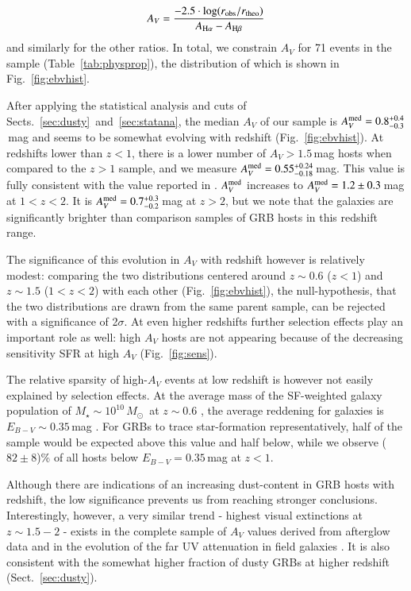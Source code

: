 \documentclass[traditabstract, longauth]{aa}
\newcommand{\Msun}{$M_\odot$}
\begin{document}
\begin{equation}
A_V = \frac{-2.5\cdot\log({r_{\rm{obs}}}/{r_{\rm{theo}}})} {A_{{\rm{H}\alpha}}-A_{{\rm{H}\beta}}}
\end{equation}
and similarly for the other ratios. In total, we constrain $A_V$ for 71 events in the sample (Table~\ref{tab:physprop}), the distribution of which is shown in Fig.~\ref{fig:ebvhist}. 

 {After applying the statistical analysis and cuts of Sects.~\ref{sec:dusty}~and~\ref{sec:statana}, the median $A_V$ of our sample is $A_V^{\rm med}=0.8^{+0.4}_{-0.3}$\,mag} and seems to be somewhat evolving with redshift (Fig.~\ref{fig:ebvhist}). At redshifts lower than $z<1$, there is a lower number of $A_V>1.5$\,mag hosts when compared to the $z>1$ sample, and we measure $A_V^{\rm{med}}=0.55_{-0.18}^{+0.24}$\,mag. This value is fully consistent with the value reported in \citet{2009ApJ...691..182S}. $A_V^{\rm{med}}$ increases to $A_V^{\rm{med}}=1.2\pm0.3$\,mag at $1<z<2$. It is $A_V^{\rm{med}}=0.7_{-0.2}^{+0.3}$\,mag at $z > 2$, but we note that the galaxies are significantly brighter than comparison samples of GRB hosts in this redshift range.

The significance of this evolution in $A_V$ with redshift however is relatively modest: comparing the two distributions centered around $z\sim0.6$ ($z<1$) and $z\sim1.5$ ($1<z<2$) with each other (Fig.~\ref{fig:ebvhist}), the null-hypothesis, that the two distributions are drawn from the same parent sample, can be rejected with a significance of 2$\sigma$. At even higher redshifts further selection effects play an important role as well: high $A_V$ hosts are not appearing because of the decreasing sensitivity SFR at high $A_V$ (Fig.~\ref{fig:sens}). 

{The relative sparsity of high-$A_V$ events at low redshift is however not easily explained by selection effects. At the average mass of the SF-weighted galaxy population of $M_{\star}\sim10^{10}$\,\Msun\, at $z\sim0.6$ \citep{2013ApJ...778..128P, 2014A&A...565A.112H}, the average reddening for galaxies is $E_{B-V}\sim0.35$\,{mag} \citep[][and references therein]{2014ApJ...792...75Z}. For GRBs to trace star-formation representatively, half of the sample would be expected above this value and half below, while we observe ($82\pm8$)\% of all hosts below $E_{B-V}=0.35$\,{mag} at $z<1$.}

Although there are indications of an increasing dust-content in GRB hosts with redshift, the low significance prevents us from reaching stronger conclusions. Interestingly, however, a very similar trend - highest visual extinctions at $z\sim1.5-2$ - exists in the complete sample of $A_V$ values derived from afterglow data \citep{2013MNRAS.432.1231C} and in the evolution of the far UV attenuation in field galaxies \citep{2012A&A...539A..31C}. It is also consistent with the somewhat higher fraction of dusty GRBs at higher redshift (Sect.~\ref{sec:dusty}).
\end{document}
